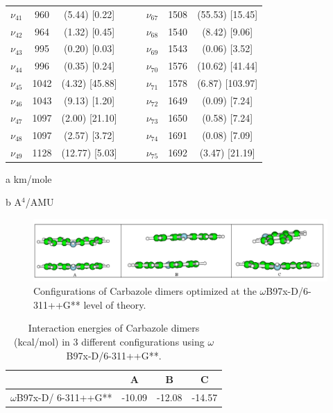 \begin{table}[H]
\begin{center}
\begin{threeparttable}
\begin{tabular}{c c c c c c c c}
					$\nu_{41}$&	960&	(5.44)	[0.22] & & &	$\nu_{67}$&	1508&	(55.53)	[15.45]\\
					$\nu_{42}$&	964&	(1.32)	[0.45] & & &	$\nu_{68}$&	1540&	(8.42)	[9.06]\\
					$\nu_{43}$&	995&	(0.20)	[0.03] & & &	$\nu_{69}$&	1543&	(0.06)	[3.52]\\
					$\nu_{44}$&	996&	(0.35)	[0.24] & & &	$\nu_{70}$&	1576&	(10.62)	[41.44]\\
					$\nu_{45}$&	1042&	(4.32)	[45.88]	 & &&$\nu_{71}$&	1578&	(6.87)	[103.97]\\
					$\nu_{46}$&	1043&	(9.13)	[1.20] & & &	$\nu_{72}$&	1649&	(0.09)	[7.24]\\
					$\nu_{47}$&	1097&	(2.00)	[21.10] & & &	$\nu_{73}$&	1650&	(0.58)	[7.24]\\
					$\nu_{48}$&	1097&	(2.57)	[3.72] & & &	$\nu_{74}$&	1691&	(0.08)	[7.09]\\
					$\nu_{49}$&	1128&	(12.77)	[5.03] & & &	$\nu_{75}$&	1692&	(3.47)	[21.19]\\
					\bottomrule
				\end{tabular}
				
				\begin{tablenotes}
					\item[a] km/mole
					\item[b] A$^{4}$/AMU
				\end{tablenotes}
			\end{threeparttable}
		\end{center}
		\label{freq-IndoleDi}
	\end{table}
	
		\begin{figure}[H]
			\centering
			\includegraphics[scale=0.5]{image/Carbazole-dimer}
			\caption{Configurations of Carbazole dimers optimized at the $\omega$B97x-D/6-311++G** level of theory.}  \label{fig-carbazoleDi}
		\end{figure}
		
		
		\begin{table}[H]
			\caption{Interaction energies of Carbazole dimers (kcal/mol) in 3 different configurations using $\omega$B97x-D/6-311++G**.}
			\begin{center}
				\begin{tabular}{c c c c}
					\hline
					& \textbf{A} & \textbf{B} & \textbf{C} \\ \hline
					$\omega$B97x-D/
					6-311++G** & -10.09 & -12.08 & -14.57 \\ \hline
				\end{tabular}
			\end{center}
			\label{energie-carbazoleDi}
		\end{table}
		
